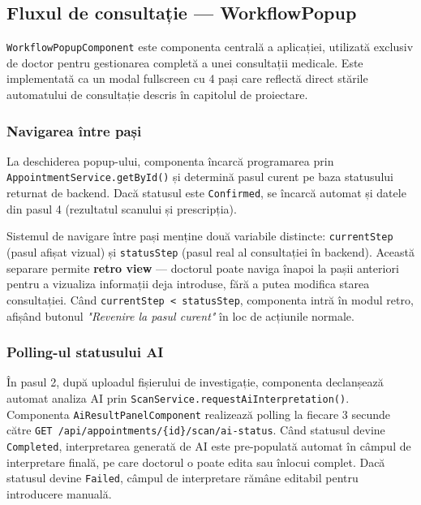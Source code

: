 \documentclass[12pt, a4paper]{report}
\begin{document}
\subsection{Fluxul de consultație --- WorkflowPopup}

\texttt{WorkflowPopupComponent} este componenta centrală a aplicației, utilizată
exclusiv de doctor pentru gestionarea completă a unei consultații medicale. Este
implementată ca un modal fullscreen cu 4 pași care reflectă direct stările
automatului de consultație descris în capitolul de proiectare.

\subsubsection{Navigarea între pași}

La deschiderea popup-ului, componenta încarcă programarea prin
\texttt{AppointmentService.getById()} și determină pasul curent pe baza statusului
returnat de backend. Dacă statusul este \texttt{Confirmed}, se încarcă automat și
datele din pasul 4 (rezultatul scanului și prescripția).

Sistemul de navigare între pași menține două variabile distincte:
\texttt{currentStep} (pasul afișat vizual) și \texttt{statusStep} (pasul real
al consultației în backend). Această separare permite \textbf{retro view} ---
doctorul poate naviga înapoi la pașii anteriori pentru a vizualiza informații
deja introduse, fără a putea modifica starea consultației. Când \texttt{currentStep
< statusStep}, componenta intră în modul retro, afișând butonul
\textit{"Revenire la pasul curent"} în loc de acțiunile normale.

\subsubsection{Polling-ul statusului AI}

În pasul 2, după uploadul fișierului de investigație, componenta declanșează
automat analiza AI prin \texttt{ScanService.requestAiInterpretation()}. Componenta
\texttt{AiResultPanelComponent} realizează polling la fiecare 3 secunde către
\texttt{GET /api/appointments/\{id\}/scan/ai-status}. Când statusul devine
\texttt{Completed}, interpretarea generată de AI este pre-populată automat în
câmpul de interpretare finală, pe care doctorul o poate edita sau înlocui complet.
Dacă statusul devine \texttt{Failed}, câmpul de interpretare rămâne editabil
pentru introducere manuală.

\end{document}
